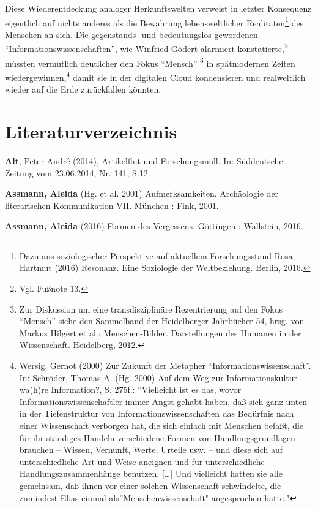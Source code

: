 \documentclass[a4paper,
fontsize=11pt,
oneside,
numbers=noperiodatend,
parskip=half-,
bibliography=totoc,
final
]{scrartcl}
\begin{document}
Diese Wiederentdeckung analoger Herkunftswelten verweist in letzter
Konsequenz eigentlich auf nichts anderes als die Bewahrung
lebensweltlicher Realitäten\footnote{Dazu aus soziologischer Perspektive
  auf aktuellem Forschungsstand Rosa, Hartmut (2016) Resonanz. Eine
  Soziologie der Weltbeziehung. Berlin, 2016.} des Menschen an sich. Die
gegenstands- und bedeutungslos gewordenen
\enquote{Informationswissenschaften}, wie Winfried Gödert alarmiert
konstatierte,\footnote{Vgl. Fußnote 13.} müssten vermutlich deutlicher
den Fokus \enquote{Mensch} \footnote{Zur Diskussion um eine
  transdisziplinäre Rezentrierung auf den Fokus \enquote{Mensch} siehe
  den Sammelband der Heidelberger Jahrbücher 54, hrsg. von Markus
  Hilgert et al.: Menschen-Bilder. Darstellungen des Humanen in der
  Wissenschaft. Heidelberg, 2012.} in spätmodernen Zeiten
wiedergewinnen,\footnote{Wersig, Gernot (2000) Zur Zukunft der Metapher
  \enquote{Informationswissenschaft}. In: Schröder, Thomas A. (Hg. 2000)
  Auf dem Weg zur Informationskultur wa(h)re Information?, S. 275f.:
  \enquote{Vielleicht ist es das, wovor Informationswissenschaftler
  immer Angst gehabt haben, daß sich ganz unten in der Tiefenstruktur
  von Informationswissenschaften das Bedürfnis nach einer Wissenschaft
  verborgen hat, die sich einfach mit Menschen befaßt, die für ihr
  ständiges Handeln verschiedene Formen von Handlungsgrundlagen brauchen
  -- Wissen, Vernunft, Werte, Urteile usw. -- und diese sich auf
  unterschiedliche Art und Weise aneignen und für unterschiedliche
  Handlungszusammenhänge benutzen. {[}\ldots{}{]} Und vielleicht hatten
  sie alle gemeinsam, daß ihnen vor einer solchen Wissenschaft
  schwindelte, die zumindest Elias einmal als}Menschenwissenschaft"
  angesprochen hatte."} damit sie in der digitalen Cloud kondensieren
und realweltlich wieder auf die Erde zurückfallen könnten.

\section*{Literaturverzeichnis}\label{literaturverzeichnis}

\textbf{Alt}, Peter-André (2014), Artikelflut und Forschungsmüll. In:
Süddeutsche Zeitung vom 23.06.2014, Nr. 141, S.12.

\textbf{Assmann, Aleida} (Hg. et al. 2001) Aufmerksamkeiten. Archäologie
der literarischen Kommunikation VII. München : Fink, 2001.

\textbf{Assmann, Aleida} (2016) Formen des Vergessens. Göttingen :
Wallstein, 2016.
\end{document}
